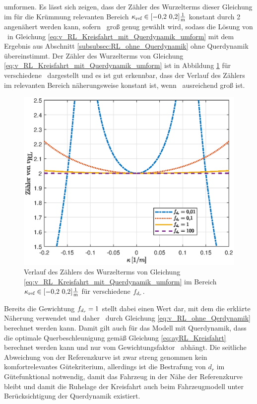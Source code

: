 umformen. Es lässt sich zeigen, dass der Zähler des Wurzelterms dieser Gleichung im für die Krümmung relevanten Bereich $\kappa_{\textrm{ref}}\in [-0{,}2~0{,}2]\frac{1}{\mathrm{m}}$ konstant durch 2 angenähert werden kann, sofern \fdr~groß genug gewählt wird, sodass die Lösung von \vRL~in Gleichung \eqref{eq:v_RL_Kreisfahrt_mit_Querdynamik_umform} mit dem Ergebnis aus Abschnitt \ref{subsubsec:RL_ohne_Querdynamik} ohne Querdynamik übereinstimmt. Der Zähler des Wurzelterms von Gleichung \eqref{eq:v_RL_Kreisfahrt_mit_Querdynamik_umform} ist in Abbildung \ref{fig:zaehler_vRL} für verschiedene \fdr~dargestellt und es ist gut erkennbar, dass der Verlauf des Zählers im relevanten Bereich näherungsweise konstant ist, wenn \fdr~ausreichend groß ist. 
\begin{figure}[h] 
	\centering
	\includegraphics[width=0.8\linewidth]{./Bilder/Ergebnisse/Kreisfahrt/Mit_Querdynamik/zaehler_vRL.eps}
	\caption{Verlauf des Zählers des Wurzelterms von Gleichung \eqref{eq:v_RL_Kreisfahrt_mit_Querdynamik_umform} im Bereich $\kappa_{\textrm{ref}}\in [-0{,}2~0{,}2]\frac{1}{\mathrm{m}}$ für verschiedene $f_{d_r}$.}
	\label{fig:zaehler_vRL}
\end{figure} 
Bereits die Gewichtung $f_{d_r}=1$ stellt dabei einen Wert dar, mit dem die erklärte Näherung verwendet und daher \vRL~durch Gleichung \eqref{eq:v_RL_ohne_Qerdynamik} berechnet werden kann. Damit gilt auch für das Modell mit Querdynamik, dass die optimale Querbeschleunigung gemäß Gleichung \eqref{eq:ayRL_Kreisfahrt} berechnet werden kann und nur vom Gewichtungsfaktor \fay~abhängt. Die seitliche Abweichung von der Referenzkurve ist zwar streng genommen kein komfortrelevantes Gütekriterium, allerdings ist die Bestrafung von $d_r$ im Gütefunktional notwendig, damit das Fahrzeug in der Nähe der Referenzkurve bleibt und damit die Ruhelage der Kreisfahrt auch beim Fahrzeugmodell unter Berücksichtigung der Querdynamik existiert.

